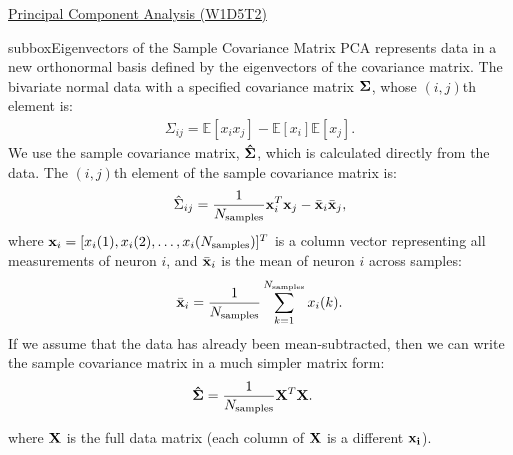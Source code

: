 \begin{textbox}{\href{https://compneuro.neuromatch.io/tutorials/W1D5_DimensionalityReduction/student/W1D5_Tutorial2.html}{Principal Component Analysis (W1D5T2)} }
\begin{subbox}{subbox}{Eigenvectors of the Sample Covariance Matrix}
\scriptsize
PCA represents data in a new orthonormal basis defined by the eigenvectors of the covariance matrix. The bivariate normal data with a specified covariance matrix $\bf \Sigma$, whose $(i,j)$th element is:
\begin{align}
\Sigma_{ij} = \mathbb{E}[ x_i x_j ] - \mathbb{E}[ x_i] \mathbb{E}[ x_j ] .
\end{align}
 We use the sample covariance matrix, $\bf\hat\Sigma$, which is calculated directly from the data. The $(i,j)$th element of the sample covariance matrix is:
\begin{align}
 \hat \Sigma_{ij} =  \frac{1}{N_\text{samples}}{\bf x}_i^T {\bf x}_j - \bar {\bf x}_i \bar{\bf x}_j ,
\end{align}
where ${\bf x}_i = [ x_i(1), x_i(2), \dots,x_i(N_\text{samples})]^T$ is a column vector representing all measurements of neuron $i$, and  $\bar {\bf x}_i$ is the mean of neuron $i$ across samples:
\begin{align}
\bar {\bf x}_i = \frac{1}{N_\text{samples}} \sum_{k=1}^{N_\text{samples}} x_i(k).
\end{align}
If we assume that the data has already been mean-subtracted, then we can write the sample covariance matrix in a much simpler matrix form:
\begin{align}
{\bf \hat \Sigma}
&= \frac{1}{N_\text{samples}} {\bf X}^T {\bf X}.
\end{align}

where $\bf X$ is the full data matrix (each column of $\bf X$ is a different $\bf x_i$). 
\end{subbox}

\end{textbox}
